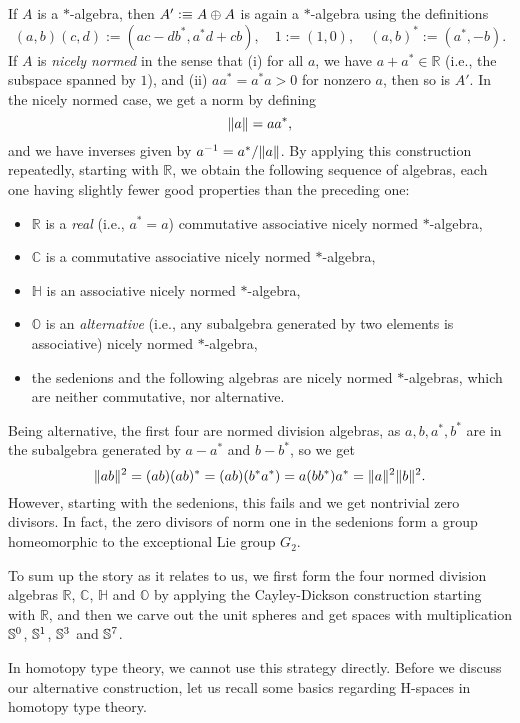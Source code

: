 If $A$ is a $*$-algebra, then $A' \vcentcolon\equiv A\oplus A$ is again a
$*$-algebra using the definitions
\begin{equation}
  \label{eq:classical-cd}
  (a,b)(c,d) := (ac - db^*, a^*d + cb),
  \quad 1 := (1,0),
  \quad (a,b)^* := (a^*,-b).
\end{equation}
If $A$ is \emph{nicely normed} in the sense that (i) for all $a$, we have $a+a^*\in \mathbb R$
(i.e., the subspace spanned by $1$), and (ii) $aa^*=a^*a>0$ for
nonzero $a$, then so is $A'$. In the nicely normed case, we get a norm by defining
\[\lVert a\rVert = aa^*,\]
and we have inverses given by $a^{-1}=a^*/\lVert a\rVert$.
By applying this construction repeatedly, starting with $\mathbb{R}$, we obtain the
following sequence of algebras, each one having slightly fewer good
properties than the preceding one:
\begin{itemize}
\item $\mathbb R$ is a \emph{real} (i.e., $a^*=a$) commutative associative
  nicely normed $*$-algebra,
\item $\mathbb C$ is a commutative associative nicely normed $*$-algebra,
\item $\mathbb H$ is an associative nicely normed $*$-algebra,
\item $\mathbb O$ is an \emph{alternative} (i.e., any subalgebra generated by
  two elements is associative) nicely normed $*$-algebra,
\item the sedenions and the following algebras are nicely normed
  $*$-algebras, which are neither commutative, nor alternative.
\end{itemize}
Being alternative, the first four are normed division algebras, as
$a,b,a^*,b^*$ are in the subalgebra generated by $a-a^*$ and $b-b^*$,
so we get
\[ \lVert ab\rVert^2 = (ab)(ab)^* = (ab)(b^*a^*) = a(bb^*)a^* = \lVert a\rVert^2\lVert b\rVert^2.\]
However, starting with the sedenions, this fails and we get nontrivial
zero divisors. In fact, the zero divisors of norm one in the sedenions
form a group homeomorphic to the exceptional Lie group $G_2$.

To sum up the story as it relates to us, we first form the four normed
division algebras $\mathbb R$, $\mathbb C$, $\mathbb H$ and $\mathbb
O$ by applying the Cayley-Dickson construction starting with $\mathbb
R$, and then we carve out the unit spheres and get spaces with
multiplication $\mathbb{S}^0$, $\mathbb{S}^1$, $\mathbb{S}^3$ and $\mathbb{S}^7$.

In homotopy type theory, we cannot use this strategy directly. Before we
discuss our alternative construction, let us recall some basics
regarding H-spaces in homotopy type theory.

